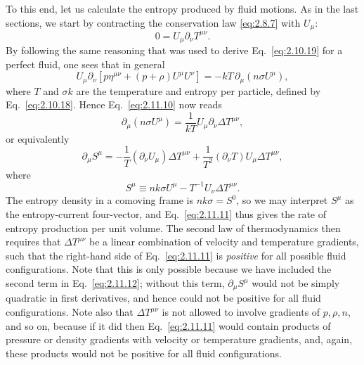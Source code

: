 To this end, let us calculate the entropy produced by fluid motions. As in the
last sections, we start by contracting the conservation law
\eqref{eq:2.8.7} with \(U_\mu\):
\begin{equation}
  0=U_\mu\partial_\nu T^{\mu\nu}.
  \tag{2.11.10}\label{eq:2.11.10}
\end{equation}
By following the same reasoning that was used to derive
Eq.~\eqref{eq:2.10.19} for a perfect fluid, one sees that in general
\[
  U_\mu\partial_\nu
  \left[p\eta^{\mu\nu}+(p+\rho)U^\mu U^\nu\right]
  =-kT\,\partial_\mu(n\sigma U^\mu),
\]
where \(T\) and \(\sigma k\) are the temperature and entropy per particle,
defined by Eq.~\eqref{eq:2.10.18}. Hence Eq.~\eqref{eq:2.11.10} now reads
\[
  \partial_\mu(n\sigma U^\mu)
  =\frac1{kT}U_\mu\partial_\nu\Delta T^{\mu\nu},
\]
or equivalently
\begin{equation}
  \partial_\mu S^\mu
  =-\frac1T(\partial_\nu U_\mu)\Delta T^{\mu\nu}
   +\frac1{T^2}(\partial_\nu T)U_\mu\Delta T^{\mu\nu},
  \tag{2.11.11}\label{eq:2.11.11}
\end{equation}
where
\begin{equation}
  S^\mu\equiv nk\sigma U^\mu
  -T^{-1}U_\nu\Delta T^{\mu\nu}.
  \tag{2.11.12}\label{eq:2.11.12}
\end{equation}
The entropy density in a comoving frame is \(nk\sigma=S^0\), so we may
interpret \(S^\mu\) as the entropy-current four-vector, and
Eq.~\eqref{eq:2.11.11} thus gives the rate of entropy production per unit
volume. The second law of thermodynamics then requires that
\(\Delta T^{\mu\nu}\) be a linear combination of velocity and temperature
gradients, such that the right-hand side of Eq.~\eqref{eq:2.11.11} is
\emph{positive} for all possible fluid configurations. Note that this is only
possible because we have included the second term in Eq.~\eqref{eq:2.11.12};
without this term, \(\partial_\mu S^\mu\) would not be simply quadratic in
first derivatives, and hence could not be positive for all fluid
configurations. Note also that \(\Delta T^{\mu\nu}\) is not allowed to involve
gradients of \(p,\rho,n\), and so on, because if it did then
Eq.~\eqref{eq:2.11.11} would contain products of pressure or density gradients
with velocity or temperature gradients, and, again, these products would not be
positive for all fluid configurations.

